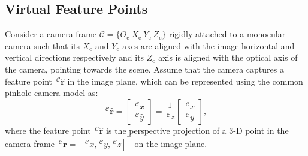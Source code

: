 \documentclass[lettersize,journal]{IEEEtran}
\begin{document}
\subsection{Virtual Feature Points}
Consider a camera frame $\mathcal{C}=\{O_{\text{c}} ~X_{\text{c}} ~Y_{\text{c}} ~Z_{\text{c}}\}$ rigidly attached to a monocular camera such that its $X_{\text{c}}$ and $Y_{\text{c}}$ axes are aligned with the image horizontal and vertical directions respectively and its $Z_{\text{c}}$ axis is aligned with the optical axis of the camera, pointing towards the scene.
Assume that the camera captures a feature point $\,^\mathcal{C} \boldsymbol{\hat{r}}$ in the image plane, which can be represented using the common pinhole camera model as:
\begin{equation}
\label{pinhole camera model}
    \,^\mathcal{C} \boldsymbol{\hat{r}} = \begin{bmatrix} \,^\mathcal{C} \hat{x} \\ \,^\mathcal{C} \hat{y} \end{bmatrix}
    = \frac{1}{\,^\mathcal{C} z} \begin{bmatrix} \,^\mathcal{C} x \\ \,^\mathcal{C} y\end{bmatrix},
\end{equation}
where the feature point $\,^\mathcal{C} \boldsymbol{\hat{r}}$ is the perspective projection of a 3-D point in the camera frame $\,^\mathcal{C} \boldsymbol{r} = [\,^\mathcal{C} x, \,^\mathcal{C} y, \,^\mathcal{C} z]^{\top}$ on the image plane.
\end{document}
